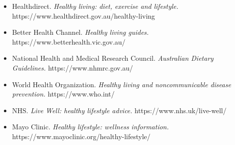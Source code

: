 \begin{itemize}
    \item Healthdirect. \textit{Healthy living: diet, exercise and lifestyle.} https://www.healthdirect.gov.au/healthy-living
    \item Better Health Channel. \textit{Healthy living guides.} https://www.betterhealth.vic.gov.au/
    \item National Health and Medical Research Council. \textit{Australian Dietary Guidelines.} https://www.nhmrc.gov.au/
    \item World Health Organization. \textit{Healthy living and noncommunicable disease prevention.} https://www.who.int/
    \item NHS. \textit{Live Well: healthy lifestyle advice.} https://www.nhs.uk/live-well/
    \item Mayo Clinic. \textit{Healthy lifestyle: wellness information.} https://www.mayoclinic.org/healthy-lifestyle/
\end{itemize}
